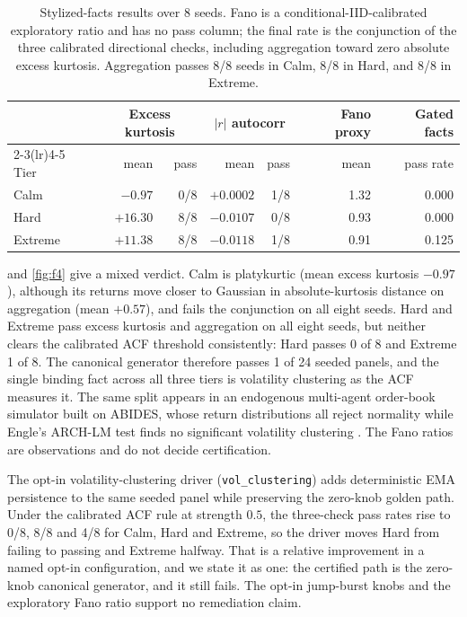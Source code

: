 \begin{table}[t]
\centering
\caption{Stylized-facts results over 8 seeds. Fano is a conditional-IID-calibrated exploratory ratio and has no pass column; the final rate is the conjunction of the three calibrated directional checks, including aggregation toward zero absolute excess kurtosis. Aggregation passes 8/8 seeds in Calm, 8/8 in Hard, and 8/8 in Extreme.}
\label{tab:f4}
\small
\setlength{\tabcolsep}{5pt}
\begin{tabular}{l rr rr r r}
\toprule
 & \multicolumn{2}{c}{Excess kurtosis} & \multicolumn{2}{c}{$|r|$ autocorr} & {Fano proxy} & {Gated facts} \\
\cmidrule(lr){2-3}\cmidrule(lr){4-5}
Tier & mean & pass & mean & pass & mean & pass rate \\
\midrule
Calm & $-0.97$ & 0/8 & $+0.0002$ & 1/8 & 1.32 & 0.000 \\
Hard & $+16.30$ & 8/8 & $-0.0107$ & 0/8 & 0.93 & 0.000 \\
Extreme & $+11.38$ & 8/8 & $-0.0118$ & 1/8 & 0.91 & 0.125 \\
\bottomrule
\end{tabular}
\end{table}

 and \cref{fig:f4} give a mixed verdict. Calm is platykurtic (mean excess kurtosis $-0.97$), although its returns move closer to Gaussian in absolute-kurtosis distance on aggregation (mean $+0.57$), and fails the conjunction on all eight seeds. Hard and Extreme pass excess kurtosis and aggregation on all eight seeds, but neither clears the calibrated ACF threshold consistently: Hard passes 0 of 8 and Extreme 1 of 8. The canonical generator therefore passes 1 of 24 seeded panels, and the single binding fact across all three tiers is volatility clustering as the ACF measures it. The same split appears in an endogenous multi-agent order-book simulator built on ABIDES, whose return distributions all reject normality while Engle's ARCH-LM test finds no significant volatility clustering \citep[p.~20]{cheridito2025abidesmarl}. The Fano ratios are observations and do not decide certification.

The opt-in volatility-clustering driver (\texttt{vol\_clustering}) adds deterministic EMA persistence to the same seeded panel while preserving the zero-knob golden path. Under the calibrated ACF rule at strength $0.5$, the three-check pass rates rise to 0/8, 8/8 and 4/8 for Calm, Hard and Extreme, so the driver moves Hard from failing to passing and Extreme halfway. That is a relative improvement in a named opt-in configuration, and we state it as one: the certified path is the zero-knob canonical generator, and it still fails. The opt-in jump-burst knobs and the exploratory Fano ratio support no remediation claim.

